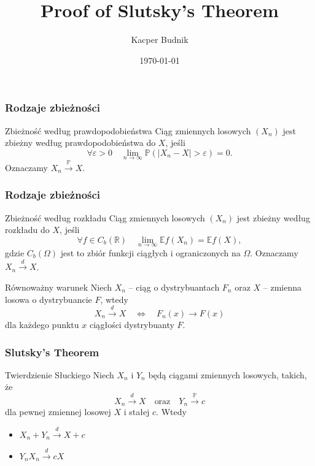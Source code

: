 \documentclass{beamer}
\title{Proof of Slutsky's Theorem}
\author{Kacper Budnik}
\institute{Wrocław University of Science and Technology}
\date{\today}
\begin{document}
	
	\frame{\titlepage}
	
	\begin{frame}
		\frametitle{Rodzaje zbieżności}
		\begin{block}{Zbieżność według prawdopodobieństwa}
			Ciąg zmiennych losowych $(X_n)$ jest zbieżny według prawdopodobieństwa do $X$, jeśli
			\begin{equation}
				\forall\varepsilon>0\quad\lim\limits_{n\to\infty}\mathbb{P}\left(|X_n-X|>\varepsilon\right)=0.
			\end{equation}
		Oznaczamy $X_n\xrightarrow{\mathbb{P}}X$.
		\end{block}
	\end{frame}

	\begin{frame}
		\frametitle{Rodzaje zbieżności}
		\begin{block}{Zbieżność według rozkładu}
			Ciąg zmiennych losowych $(X_n)$ jest zbieżny według rozkładu do $X$, jeśli
			\begin{equation}
				\forall f\in C_b(\mathbb{R})\quad\lim\limits_{n\to\infty}\mathbb{E}f\left(X_n\right)=\mathbb{E}f\left(X\right),
			\end{equation}
			gdzie  $C_b(\Omega)$ jest to zbiór funkcji ciągłych i ograniczonych na $\Omega$. Oznaczamy $X_n\xrightarrow{d}X$.
		\end{block}\pause
		\begin{block}{Równoważny warunek}
			Niech $X_n$ -- ciąg o dystrybuantach $F_n$ oraz $X$ -- zmienna losowa o dystrybuancie $F$, wtedy
			\begin{equation}
				X_n\xrightarrow{d}X \quad\iff\quad F_n(x)\to F(x)
			\end{equation}
			dla każdego punktu $x$ ciągłości dystrybuanty $F$.
		\end{block}
	\end{frame}
	
	\begin{frame}
		\frametitle{Slutsky's Theorem}
		\begin{block}{Twierdzienie Słuckiego}
			Niech $X_n$ i $Y_n$ będą ciągami zmiennych losowych, takich, że
			\begin{equation}
				X_n\xrightarrow{d}X \quad\text{oraz}\quad 	Y_n\xrightarrow{\mathbb{P}}c
			\end{equation}
			dla pewnej zmiennej losowej $X$ i stałej $c$. Wtedy
			\begin{itemize}
				\item $ X_n+Y_n \xrightarrow{d} X + c $
				\item  $Y_nX_n \xrightarrow{d} cX$
			\end{itemize}
		\end{block}
	\end{frame}
\end{document}
